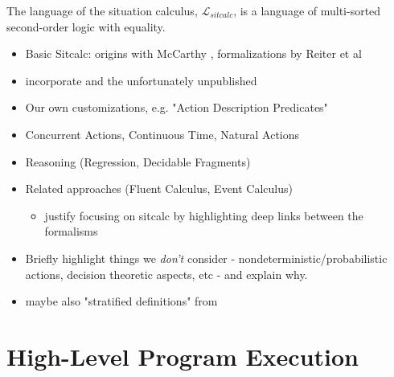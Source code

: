 The language of the situation calculus, $\mathcal{L}_{sitcalc}$, is a language
of multi-sorted second-order logic with equality.

\begin{itemize}
\item Basic Sitcalc: origins with McCarthy \cite{McCHay69sitcalc}, formalizations by Reiter et al \cite{reiter01kia,pirri99contributions_sitcalc,levesque98sc_foundations}
\item incorporate \cite{pinto99ramification,pinto98interacting_effects} and the unfortunately unpublished \cite{pinto00action_interaction}
\item Our own customizations, e.g. "Action Description Predicates" \cite{kelly07sc_persistence}
\item Concurrent Actions, Continuous Time, Natural Actions \cite{pinto94temporal,reiter96sc_nat_conc}
\item Reasoning (Regression, Decidable Fragments)
\item Related approaches (Fluent Calculus, Event Calculus)
  \begin{itemize}
  \item justify focusing on sitcalc by highlighting deep links between the formalisms
  \end{itemize}
\item Briefly highlight things we \emph{don't} consider - nondeterministic/probabilistic actions, decision theoretic aspects, etc - and explain why.
\item maybe also "stratified definitions" from \cite{pinto94temporal}
\end{itemize}

\section{High-Level Program Execution}

